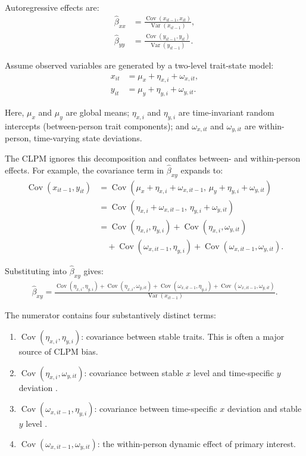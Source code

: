 \documentclass[12pt]{article}
\begin{document}
Autoregressive effects are:
\begin{align}
\hat{\beta}_{xx} &= \frac{\operatorname{Cov}(x_{it-1}, x_{it})}{\operatorname{Var}(x_{it-1})},\\
\hat{\beta}_{yy} &= \frac{\operatorname{Cov}(y_{it-1}, y_{it})}{\operatorname{Var}(y_{it-1})}.
\end{align}

Assume observed variables are generated by a two-level trait-state model:
\begin{align}
x_{it} &= \mu_x + \eta_{x,i} + \omega_{x,it},\\
y_{it} &= \mu_y + \eta_{y,i} + \omega_{y,it}.
\end{align}

Here, $\mu_x$ and $\mu_y$ are global means; $\eta_{x,i}$ and $\eta_{y,i}$ are time-invariant random intercepts (between-person trait components); and $\omega_{x,it}$ and $\omega_{y,it}$ are within-person, time-varying state deviations.

The CLPM ignores this decomposition and conflates between- and within-person effects. For example, the covariance term in $\hat{\beta}_{xy}$ expands to:
\begin{align}
\operatorname{Cov}(x_{it-1}, y_{it}) &= \operatorname{Cov}(\mu_x + \eta_{x,i} + \omega_{x,it-1},\, \mu_y + \eta_{y,i} + \omega_{y,it}) \\
&= \operatorname{Cov}(\eta_{x,i} + \omega_{x,it-1},\, \eta_{y,i} + \omega_{y,it}) \\
&= \operatorname{Cov}(\eta_{x,i}, \eta_{y,i}) + \operatorname{Cov}(\eta_{x,i}, \omega_{y,it}) \\
&\quad + \operatorname{Cov}(\omega_{x,it-1}, \eta_{y,i}) + \operatorname{Cov}(\omega_{x,it-1}, \omega_{y,it}).
\end{align}

Substituting into $\hat{\beta}_{xy}$ gives:
\begin{align}
\hat{\beta}_{xy}
= \frac{\operatorname{Cov}(\eta_{x,i}, \eta_{y,i}) + \operatorname{Cov}(\eta_{x,i}, \omega_{y,it}) + \operatorname{Cov}(\omega_{x,it-1}, \eta_{y,i}) + \operatorname{Cov}(\omega_{x,it-1}, \omega_{y,it})}{\operatorname{Var}(x_{it-1})}.
\end{align}

The numerator contains four substantively distinct terms:
\begin{enumerate}
\item $\operatorname{Cov}(\eta_{x,i}, \eta_{y,i})$: covariance between stable traits. This is often a major source of CLPM bias.
\item $\operatorname{Cov}(\eta_{x,i}, \omega_{y,it})$: covariance between stable $x$ level and time-specific $y$ deviation \cite{federico_feldman_weber}.
\item $\operatorname{Cov}(\omega_{x,it-1}, \eta_{y,i})$: covariance between time-specific $x$ deviation and stable $y$ level \cite{federico_feldman_weber}.
\item $\operatorname{Cov}(\omega_{x,it-1}, \omega_{y,it})$: the within-person dynamic effect of primary interest.
\end{enumerate}
\end{document}
